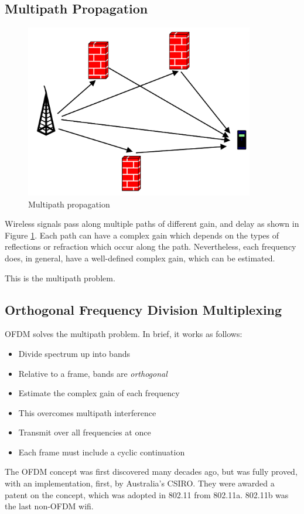 \subsection{Multipath Propagation}
\begin{figure}
	\includegraphics[width=10cm]{multipathproblem.png}
	\caption{Multipath propagation}\label{multipath}
\end{figure}
Wireless signals pass along multiple paths of different gain, and delay
as shown in Figure \ref{multipath}.
Each path can have a complex gain which depends on the types of
reflections or refraction which occur along the path. Nevertheless, each
frequency does, in general, have a well-defined complex gain, which
can be estimated.

This is the multipath problem.

\subsection{Orthogonal Frequency Division Multiplexing}
OFDM solves the multipath problem. In brief, it works as
follows:
\begin{itemize}
\item Divide spectrum up into bands
\item Relative to a frame, bands are {\em orthogonal}
\item Estimate the complex gain of each frequency
\item This overcomes multipath interference
\item Transmit over all frequencies at once
\item Each frame must include a cyclic continuation
\end{itemize}

The OFDM concept was first discovered many decades ago, but
was fully proved, with an implementation, first, by Australia's CSIRO.
They were awarded a patent on the concept, which was adopted in 802.11 
from 802.11a. 802.11b was the last non-OFDM wifi.
